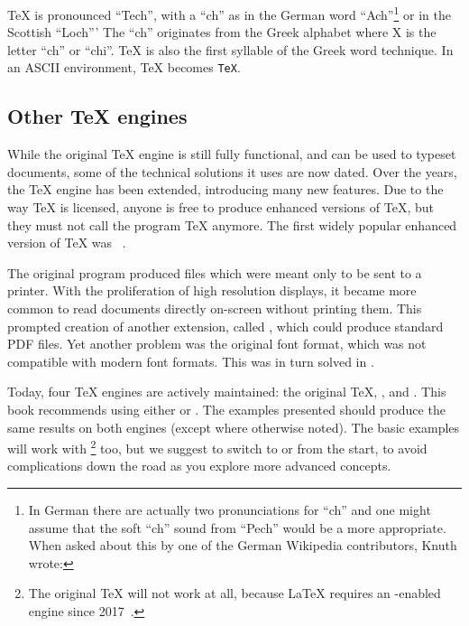 \TeX{} is pronounced \enquote{Tech}, with a \enquote{ch} as in the German word
\enquote{Ach}\footnote{In German there are actually two pronunciations for
  \enquote{ch} and one might assume that the soft \enquote{ch} sound from
  \enquote{Pech} would be a more appropriate. When asked about this by one of
  the German Wikipedia contributors, Knuth wrote:
  } or in the
Scottish \enquote{Loch}' The \enquote{ch} originates from the Greek alphabet
where X is the letter \enquote{ch} or \enquote{chi}. \TeX{} is also the first
syllable of the Greek word technique. In an ASCII environment, \TeX{} becomes
\texttt{TeX}.

\subsection{Other \TeX{} engines}

While the original \TeX{} engine is still fully functional, and can be used to
typeset documents, some of the technical solutions it uses are now dated. Over
the years, the \TeX{} engine has been extended, introducing many new features.
Due to the way \TeX{} is licensed, anyone is free to produce enhanced versions
of \TeX{}, but they must not call the program \TeX{} anymore. The first widely
popular enhanced version of \TeX{} was ~\cite{etex}.

The original program produced  files which were meant only to be sent
to a printer. With the proliferation of high resolution displays, it became more
common to read documents directly on-screen without printing them. This
prompted creation of another extension, called , which could
produce standard PDF files. Yet another problem was the original font format,
which was not compatible with modern font formats. This was in turn solved in
.

Today, four \TeX{} engines are actively maintained: the original \TeX{},
,  and . This book recommends using
either  or . The examples presented should produce
the same results on both engines (except where otherwise noted). The basic
examples will work with \footnote{The original \TeX{} will not
  work at all, because \LaTeX{} requires an -enabled engine since
  2017~\cite{etex-kernel}.} too, but we suggest to switch to  or
 from the start, to avoid complications down the road as you
explore more advanced concepts.

